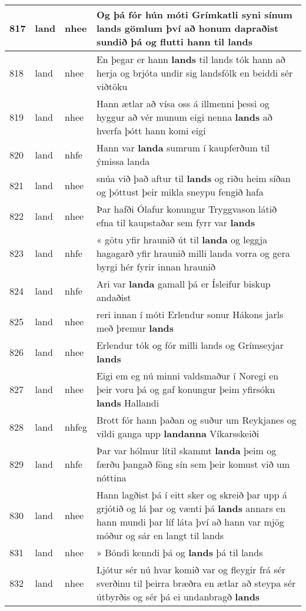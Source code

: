 \documentclass{article}
\begin{document}
\begin{longtable}{p{1cm}|p{1cm}|p{1cm}|p{13cm}}
\hline
817&land&nhee&Og þá fór hún móti Grímkatli syni sínum \textbf{lands} gömlum því að honum dapraðist sundið þá og flutti hann til lands\\
\hline
818&land&nhee&En þegar er hann \textbf{lands} til lands tók hann að herja og brjóta undir sig landsfólk en beiddi sér viðtöku\\
\hline
819&land&nhee&Hann ætlar að vísa oss á illmenni þessi og hyggur að vér munum eigi nenna \textbf{lands} að hverfa þótt hann komi eigi\\
\hline
820&land&nhfe&Hann var \textbf{landa} sumrum í kaupferðum til ýmissa landa\\
\hline
821&land&nhee&snúa við það aftur til \textbf{lands} og riðu heim síðan og þóttust þeir mikla sneypu fengið hafa\\
\hline
822&land&nhee&Þar hafði Ólafur konungur Tryggvason látið efna til kaupstaðar sem fyrr var \textbf{lands} \\
\hline
823&land&nhfe&« götu yfir hraunið út til \textbf{landa} og leggja hagagarð yfir hraunið milli landa vorra og gera byrgi hér fyrir innan hraunið\\
\hline
824&land&nhfe&Ari var \textbf{landa} gamall þá er Ísleifur biskup andaðist\\
\hline
825&land&nhee&reri innan í móti Erlendur sonur Hákons jarls með þremur \textbf{lands} \\
\hline
826&land&nhee&Erlendur tók og fór milli lands og Grímseyjar \textbf{lands} \\
\hline
827&land&nhee&Eigi em eg nú minni valdsmaður í Noregi en þeir voru þá og gaf konungur þeim yfirsókn \textbf{lands} Hallandi\\
\hline
828&land&nhfeg&Brott fór hann þaðan og suður um Reykjanes og vildi ganga upp \textbf{landanna} Víkarsskeiði\\
\hline
829&land&nhfe&Þar var hólmur lítil skammt \textbf{landa} þeim og færðu þangað föng sín sem þeir komust við um nóttina\\
\hline
830&land&nhee&Hann lagðist þá í eitt sker og skreið þar upp á grjótið og lá þar og vænti þá \textbf{lands} annars en hann mundi þar líf láta því að hann var mjög móður og sár en langt til lands\\
\hline
831&land&nhee&» Bóndi kenndi þá og \textbf{lands} þá til lands\\
\hline
832&land&nhee&Ljótur sér nú hvar komið var og fleygir frá sér sverðinu til þeirra bræðra en ætlar að steypa sér útbyrðis og sér þá ei undanbragð \textbf{lands} \\

\end{longtable}
\end{document}
